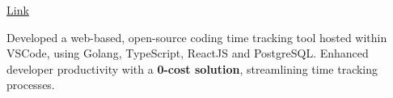 \documentclass[]{deedy-resume-reversed}
\begin{document}
\begin{minipage}[t]{0.60\textwidth}
\sectionsep
{} \hfill \href{https://github.com/sushant102004/ProgFlow-Coding-Monitoring-System/}{\small{Link \faExternalLink*}}\\
\begin{justify}    
\begin{tightemize}
\item 
Developed a web-based, open-source coding time tracking tool hosted within VSCode, using Golang, TypeScript, ReactJS and PostgreSQL. Enhanced developer productivity with a \textbf{0-cost solution}, streamlining time tracking processes.
\end{tightemize}
\end{justify}
\sectionsep








\end{minipage}
\end{document}
